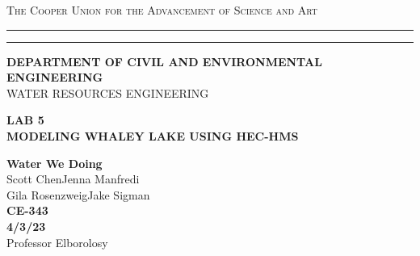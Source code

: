 \begin{titlepage}
    \begin{center}
    {{\Large{\textsc{The Cooper Union for the Advancement of Science and Art}}}} \rule[0.1cm]{15.8cm}{0.1mm}
    \rule[0.5cm]{15.8cm}{0.6mm}
    {\small{\bf DEPARTMENT OF CIVIL AND ENVIRONMENTAL ENGINEERING}}\\
    {\footnotesize{WATER RESOURCES ENGINEERING}}
    \end{center}
    \vspace{15mm}
    \begin{center}
    {\large{\bf LAB 5\\}}
    \vspace{5mm}
    {\Large{\bf MODELING WHALEY LAKE USING HEC-HMS}}
    \end{center}
    \vspace{35mm}
    \par
    \noindent
    \hfill
    \vspace{20mm}
    \begin{center}
    {\large{ {\bf Water We Doing} \\ { Scott Chen\hspace{5mm}Jenna Manfredi\\Gila Rosenzweig\hspace{5mm}Jake Sigman}}}
    \vspace{40mm}
    {\large {\bf \\CE-343 \\ 4/3/23 \\}}
    \vspace{15mm}
    {\normalsize{Professor Elborolosy}}
    \end{center}
\end{titlepage}